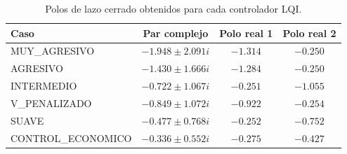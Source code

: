 \begin{table}[H]
\centering
\caption{Polos de lazo cerrado obtenidos para cada controlador LQI.}
\label{tab:parte-c-polos}
\small
\setlength{\tabcolsep}{4pt}
\begin{tabular}{lccc}
\toprule
Caso & Par complejo & Polo real 1 & Polo real 2 \\
\midrule
MUY\_AGRESIVO & $-1.948 \pm 2.091i$ & $-1.314$ & $-0.250$ \\
AGRESIVO & $-1.430 \pm 1.666i$ & $-1.284$ & $-0.250$ \\
INTERMEDIO & $-0.722 \pm 1.067i$ & $-0.251$ & $-1.055$ \\
V\_PENALIZADO & $-0.849 \pm 1.072i$ & $-0.922$ & $-0.254$ \\
SUAVE & $-0.477 \pm 0.768i$ & $-0.252$ & $-0.752$ \\
CONTROL\_ECONOMICO & $-0.336 \pm 0.552i$ & $-0.275$ & $-0.427$ \\
\bottomrule
\end{tabular}
\end{table}
